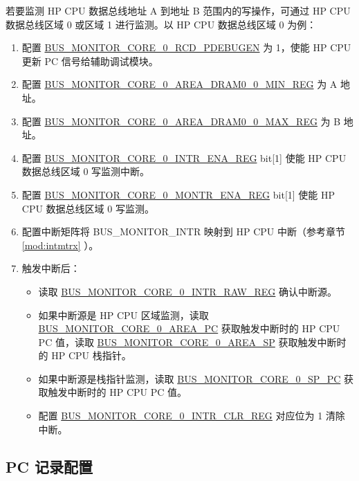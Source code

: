 \documentclass[main\_\_CN.tex]{subfiles}
\begin{document}
若要监测 HP CPU 数据总线地址 A 到地址 B 范围内的写操作，可通过 HP CPU 数据总线区域 0 或区域 1 进行监测。以 HP CPU 数据总线区域 0 为例：

\begin{enumerate}
    \item 配置 \hyperref[fielddesc:BUSMONITORCORE0RCDPDEBUGEN]{BUS\_MONITOR\_CORE\_0\_RCD\_PDEBUGEN} 为 1，使能 HP CPU 更新 PC 信号给辅助调试模块。
    \item 配置 \hyperref[regdesc:BUSMONITORCORE0AREADRAM00MINREG]{BUS\_MONITOR\_CORE\_0\_AREA\_DRAM0\_0\_MIN\_REG} 为 A 地址。
    \item 配置 \hyperref[regdesc:BUSMONITORCORE0AREADRAM00MAXREG]{BUS\_MONITOR\_CORE\_0\_AREA\_DRAM0\_0\_MAX\_REG} 为 B 地址。
    \item 配置 \hyperref[regdesc:BUSMONITORCORE0INTRENAREG]{BUS\_MONITOR\_CORE\_0\_INTR\_ENA\_REG} bit[1] 使能 HP CPU 数据总线区域 0 写监测中断。
    \item 配置 \hyperref[regdesc:BUSMONITORCORE0MONTRENAREG]{BUS\_MONITOR\_CORE\_0\_MONTR\_ENA\_REG} bit[1] 使能 HP CPU 数据总线区域 0 写监测。
    \item 配置中断矩阵将 BUS\_MONITOR\_INTR 映射到 HP CPU 中断（参考章节 \ref{mod:intmtrx} \textit{}）。
    \item 触发中断后：
    \begin{itemize}
        \item 读取 \hyperref[regdesc:BUSMONITORCORE0INTRRAWREG]{BUS\_MONITOR\_CORE\_0\_INTR\_RAW\_REG} 确认中断源。
        \item 如果中断源是 HP CPU 区域监测，读取 \hyperref[fielddesc:BUSMONITORCORE0AREAPC]{BUS\_MONITOR\_CORE\_0\_AREA\_PC} 获取触发中断时的 HP CPU PC 值，读取 \hyperref[fielddesc:BUSMONITORCORE0AREASP]{BUS\_MONITOR\_CORE\_0\_AREA\_SP} 获取触发中断时的 HP CPU 栈指针。
        \item 如果中断源是栈指针监测，读取 \hyperref[fielddesc:BUSMONITORCORE0SPPC]{BUS\_MONITOR\_CORE\_0\_SP\_PC} 获取触发中断时的 HP CPU PC 值。
        \item 配置 \hyperref[regdesc:BUSMONITORCORE0INTRCLRREG]{BUS\_MONITOR\_CORE\_0\_INTR\_CLR\_REG} 对应位为 1 清除中断。
    \end{itemize}
\end{enumerate}

\subsection{PC 记录配置}
\end{document}
